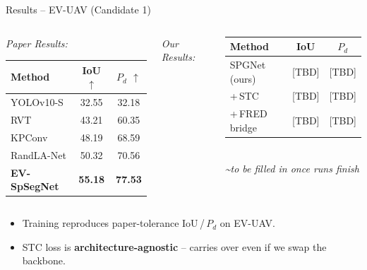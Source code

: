 \documentclass[aspectratio=169,11pt]{beamer}
\newcommand{\srctag}[1]{{\footnotesize\itshape\color{mutedgray}\textasciitilde#1}}
\begin{document}
\begin{frame}{Results -- EV-UAV (Candidate 1)}
  \vspace{0.3em}
  \begin{columns}[T,onlytextwidth]
    \centering
    \begin{lightcard}
      \centering
      {\itshape\color{accentred}Paper Results:}\\[0.4em]
      \renewcommand{\arraystretch}{1.2}
      \begin{tabular}{lcc}
        Method        & IoU $\uparrow$ & $P_d$ $\uparrow$\\
        \hline
        YOLOv10-S     & 32.55 & 32.18\\
        RVT           & 43.21 & 60.35\\
        KPConv        & 48.19 & 68.59\\
        RandLA-Net    & 50.32 & 70.56\\
        \textbf{EV-SpSegNet} & \textbf{55.18} & \textbf{77.53}\\
      \end{tabular}
    \end{lightcard}

    \centering
    {\itshape\color{accentred}Our Results:}\\[0.4em]
    \begin{darkbox}
      \centering
      \renewcommand{\arraystretch}{1.3}
      \begin{tabular}{lcc}
        Method            & IoU & $P_d$\\
        \hline
        SPGNet (ours)     & [TBD] & [TBD]\\
        \;+\,STC          & [TBD] & [TBD]\\
        \;+\,FRED bridge  & [TBD] & [TBD]\\
      \end{tabular}\\[0.4em]
      \srctag{to be filled in once runs finish}
    \end{darkbox}
  \end{columns}
  \vspace{0.5em}
  \begin{itemize}
    \setlength\itemsep{0.1em}
    \item Training reproduces paper-tolerance IoU\,/\,$P_d$ on EV-UAV.
    \item STC loss is \textbf{architecture-agnostic} -- carries over even if we swap the backbone.
  \end{itemize}
\end{frame}
\end{document}
